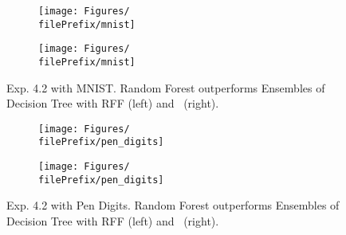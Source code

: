 \begin{figure}[H]
  \centering
  \renewcommand{\filePrefix}{\undPrefix/rff}
  \begin{subfigure}[t]{0.5\linewidth}
    \centering\captionsetup{width=.8\linewidth}\texttt{[image: Figures/\\filePrefix/mnist]}
    \label{fig:\undPrefix_mnist}
  \end{subfigure}%
  \renewcommand{\filePrefix}{\undPrefix/nys}%
  \begin{subfigure}[t]{0.5\linewidth}
    \centering\captionsetup{width=.8\linewidth}\texttt{[image: Figures/\\filePrefix/mnist]}
    \label{fig:\undPrefix_mnist}
  \end{subfigure}
  \caption*{Exp. 4.2 with MNIST. Random Forest outperforms Ensembles of Decision Tree with RFF (left) and \Nys\ (right).}
\end{figure}


\begin{figure}[H]
  \centering
  \renewcommand{\filePrefix}{\undPrefix/rff}
  \begin{subfigure}[t]{0.5\linewidth}
    \centering\captionsetup{width=.8\linewidth}\texttt{[image: Figures/\\filePrefix/pen\_digits]}
    \label{fig:\undPrefix_pen_digits}
  \end{subfigure}%
  \renewcommand{\filePrefix}{\undPrefix/nys}%
  \begin{subfigure}[t]{0.5\linewidth}
    \centering\captionsetup{width=.8\linewidth}\texttt{[image: Figures/\\filePrefix/pen\_digits]}
    \label{fig:\undPrefix_pen_digits}
  \end{subfigure}%
  \caption*{Exp. 4.2 with Pen Digits. Random Forest outperforms Ensembles of Decision Tree with RFF (left) and \Nys\ (right).}
\end{figure}


